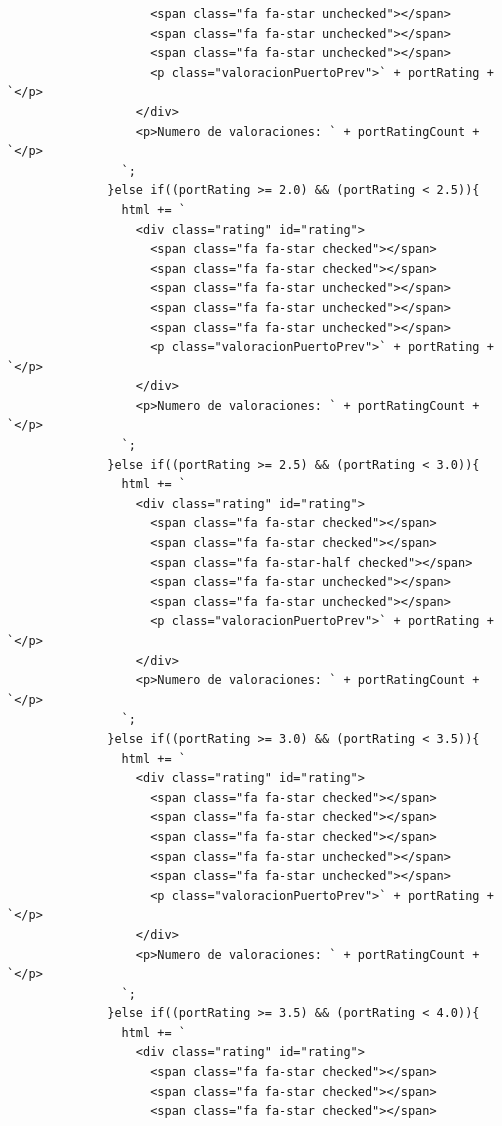 \documentclass{article}
\begin{document}
\begin{itemize}
\begin{verbatim}
                    <span class="fa fa-star unchecked"></span>
                    <span class="fa fa-star unchecked"></span>
                    <span class="fa fa-star unchecked"></span>
                    <p class="valoracionPuertoPrev">` + portRating + `</p>
                  </div>
                  <p>Numero de valoraciones: ` + portRatingCount + `</p>
                `;
              }else if((portRating >= 2.0) && (portRating < 2.5)){
                html += `
                  <div class="rating" id="rating">
                    <span class="fa fa-star checked"></span>
                    <span class="fa fa-star checked"></span>
                    <span class="fa fa-star unchecked"></span>
                    <span class="fa fa-star unchecked"></span>
                    <span class="fa fa-star unchecked"></span>
                    <p class="valoracionPuertoPrev">` + portRating + `</p>
                  </div>
                  <p>Numero de valoraciones: ` + portRatingCount + `</p>
                `;
              }else if((portRating >= 2.5) && (portRating < 3.0)){
                html += `
                  <div class="rating" id="rating">
                    <span class="fa fa-star checked"></span>
                    <span class="fa fa-star checked"></span>
                    <span class="fa fa-star-half checked"></span>
                    <span class="fa fa-star unchecked"></span>
                    <span class="fa fa-star unchecked"></span>
                    <p class="valoracionPuertoPrev">` + portRating + `</p>
                  </div>
                  <p>Numero de valoraciones: ` + portRatingCount + `</p>
                `;
              }else if((portRating >= 3.0) && (portRating < 3.5)){
                html += `
                  <div class="rating" id="rating">
                    <span class="fa fa-star checked"></span>
                    <span class="fa fa-star checked"></span>
                    <span class="fa fa-star checked"></span>
                    <span class="fa fa-star unchecked"></span>
                    <span class="fa fa-star unchecked"></span>
                    <p class="valoracionPuertoPrev">` + portRating + `</p>
                  </div>
                  <p>Numero de valoraciones: ` + portRatingCount + `</p>
                `;
              }else if((portRating >= 3.5) && (portRating < 4.0)){
                html += `
                  <div class="rating" id="rating">
                    <span class="fa fa-star checked"></span>
                    <span class="fa fa-star checked"></span>
                    <span class="fa fa-star checked"></span>

\end{verbatim}
\end{itemize}
\end{document}
